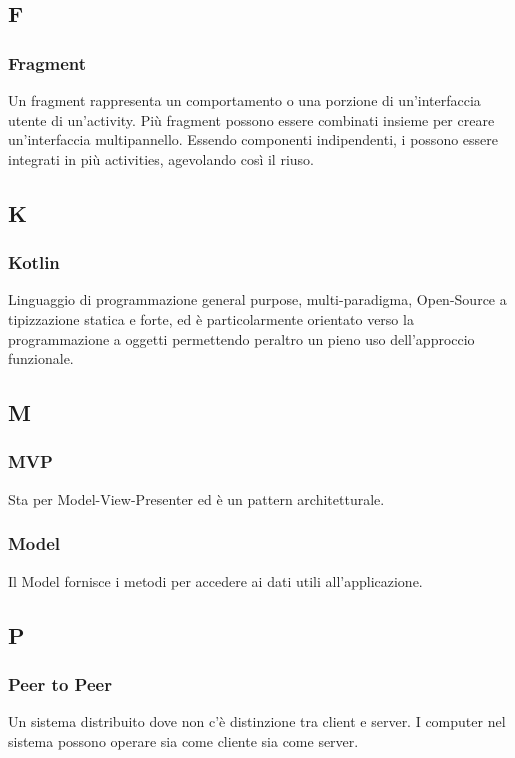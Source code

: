 \subsection*{F}
\subsubsection*{Fragment}
Un fragment rappresenta un comportamento o una porzione di un'interfaccia utente di un'activity. Più fragment possono essere combinati insieme per creare un'interfaccia multipannello. Essendo componenti indipendenti, i possono essere integrati in più activities, agevolando così il riuso.

\subsection*{K}
\subsubsection*{Kotlin}
Linguaggio di programmazione general purpose, multi-paradigma, Open-Source a tipizzazione statica e forte, ed è particolarmente orientato verso la programmazione a oggetti permettendo peraltro un pieno uso dell'approccio funzionale.

\subsection*{M}
\subsubsection*{MVP}
Sta per Model-View-Presenter ed è un pattern architetturale.
\subsubsection*{Model}
Il Model fornisce i metodi per accedere ai dati utili all'applicazione.

\subsection*{P}
\subsubsection*{Peer to Peer}
Un sistema distribuito dove non c'è distinzione tra client e server. I computer nel sistema possono operare sia come cliente sia come server. 
